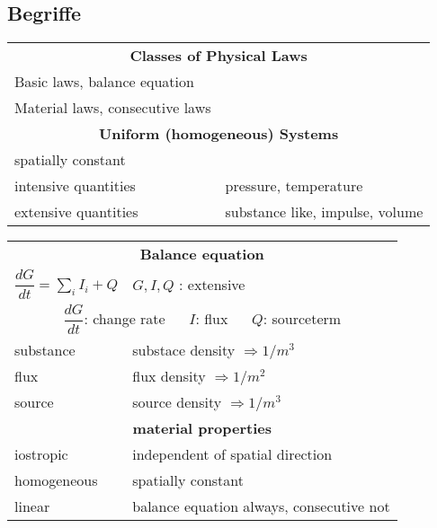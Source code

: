 \renewcommand{\arraystretch}{2}	
{
	\subsection{Begriffe}
	\begin{multicols}{2}
		
	\begin{tabularx}{\linewidth}{lX}
		\multicolumn{2}{c}{\textbf{Classes of Physical Laws}}\\
		Basic laws, balance equation & \\
		Material laws, consecutive laws & \\
		 
		\multicolumn{2}{c}{\textbf{Uniform (homogeneous) Systems}}\\
		spatially constant& \\		
		intensive quantities& pressure, temperature\\		
		extensive quantities & substance like, impulse, volume\\
	\end{tabularx}
	\vfill\columnbreak
		\begin{tabularx}{\linewidth}{lX}
			\multicolumn{2}{c}{\textbf{Balance equation}}\\
			$\dfrac{dG}{dt} = \sum\limits_{i} I_{i} + Q$ & $ G, I, Q$ : extensive \\
			\multicolumn{2}{c}{
				$\dfrac{dG}{dt}$: change rate $\quad$
				$I$: flux $\quad$
				$Q$: sourceterm} \\		
			substance & substace density $ \Rightarrow 1/m^3$\\
			flux & flux density $  \Rightarrow 1/m^2$\\
			source & source density $  \Rightarrow 1/m^3$\\
			\multicolumn{2}{c}{\textbf{material properties}}\\
			iostropic & independent of spatial direction\\
			homogeneous & spatially constant\\
			linear & balance equation always, consecutive not\\
		\end{tabularx}
	\end{multicols}
\renewcommand{\arraystretch}{1.2}			
	
}
